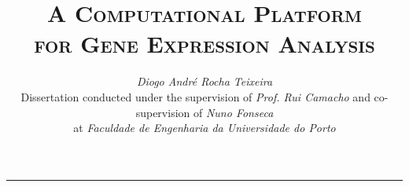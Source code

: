 \documentclass[9pt,a4paper]{extarticle}
\begin{document}
\title{\vspace*{-8mm}\textbf{\textsc{A Computational Platform\\for Gene Expression Analysis}}}
\author{\emph{Diogo André Rocha Teixeira}\\[2mm]
  \small{Dissertation conducted under the supervision of \emph{Prof. Rui Camacho} and co-supervision of \emph{Nuno Fonseca}}\\
\small{at \emph{Faculdade de Engenharia da Universidade do Porto}}}
\date{}
\maketitle
\thispagestyle{empty}

\vspace*{-4mm}\noindent\rule{\textwidth}{0.4pt}\vspace*{4mm}
\end{document}
